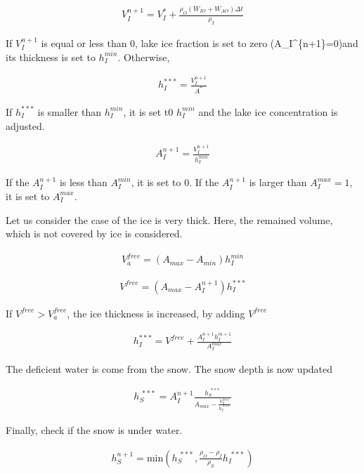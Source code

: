 \begin{eqnarray}
    V_I^{n+1} = V_I^* + \frac{\rho_O (W_{IO}+W_{AO})\Delta t}{\rho_I}
\end{eqnarray}

If \(V_I^{n+1}\) is equal or less than 0, lake ice fraction is set to
zero (A\_I\^{}\{n+1\}=0)and its thickness is set to \(h_I^{min}\).
Otherwise,

\begin{eqnarray}
    h_I^{ *** } = \frac{V_I^{n+1}}{A^*}
\end{eqnarray}

If \(h_I^{*** }\) is smaller than \(h_I^{min}\), it is set t0
\(h_I^{min}\) and the lake ice concentration is adjusted.

\begin{eqnarray}
    A_I^{n+1} = \frac{V_I^{n+1}}{h_I^{min}}
\end{eqnarray}

If the \(A_I^{n+1}\) is less than \(A_I^{min}\), it is set to 0. If the
\(A_I^{n+1}\) is larger than \(A_I^{max}=1\), it is set to
\(A_I^{max}\).

Let us consider the case of the ice is very thick. Here, the remained
volume, which is not covered by ice is considered.

\begin{eqnarray}
    V_a^{free} = (A_{max}-A_{min})h_I^{min}
\end{eqnarray}

\begin{eqnarray}
    V^{free} = (A_{max}-A_I^{n+1})h_I^{*** }
\end{eqnarray}

If \(V^{free}>V_a^{free}\), the ice thickness is increased, by adding
\(V^{free}\)

\begin{eqnarray}
    h_I^{*** } = V^{free} + \frac{A_I^{n+1} h_I^{m+1}}{A_I^{max}}
\end{eqnarray}

The deficient water is come from the snow. The snow depth is now updated

\begin{eqnarray}
    h_S^{\ *** } = A_I^{n+1}\frac{h_S^{\ *** }}{A_{max}-\frac{V_a^{free}}{h_I^{\ *** }}}
\end{eqnarray}

Finally, check if the snow is under water.

\begin{eqnarray}
    h_S^{n+1} = \mathrm{min}(h_S^{\ *** }, \frac{\rho_O-\rho_I}{\rho_S}h_I^{\ *** })
\end{eqnarray}

